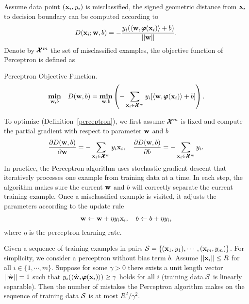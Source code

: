 {Assume data point $(\mathbf {x}_i,y_i)$ is misclassified, the signed geometric distance from $\mathbf {x}_i$ to decision boundary can be computed according to
\begin{align*}
	D(\mathbf {x}_i;\mathbf {w},b) = -\frac{y_i(\langle \mathbf {w}, \pmb \varphi(\mathbf {x}_i) \rangle+b)}{\left|\left| \mathbf {w} \right|\right|}.
\end{align*}
Denote by $\pmb {\mathcal{X}}^m$ the set of misclassified examples, the objective function of Perceptron is defined as
\begin{definition}{Perceptron Objective Function.}\label{perceptron}
	\begin{align*}
		\underset{\mathbf {w},b}{\textbf{min}} \quad D(\mathbf {w},b) = \underset{\mathbf {w},b}{\textbf{min}} \left( -\sum_{\mathbf {x}_i\in\pmb {\mathcal{X}}^{m}}y_i[\langle \mathbf {w}, \pmb \varphi(\mathbf {x}_i) \rangle+b]\right).
	\end{align*}
\end{definition}
To optimize (Definition~\ref{perceptron}), we first assume $\pmb {\mathcal{X}}^{m}$ is fixed and compute the partial gradient with respect to parameter $\mathbf {w}$ and $b$
\begin{align*}
	\frac{\partial D(\mathbf {w},b)}{\partial\mathbf {w}} = -\sum_{\mathbf {x}_i\in\pmb {\mathcal{X}}^m}{y_i\mathbf {x}_i},\quad
	\frac{\partial D(\mathbf {w},b)}{\partial b} = -\sum_{\mathbf {x}_i\in\pmb {\mathcal{X}}^m}{y_i}.
\end{align*}
In practice, the Perceptron algorithm uses stochastic gradient descent that iteratively processes one example from training data at a time.
In each step, the algorithm makes sure the current $\mathbf {w}$ and $b$ will correctly separate the current training example. 
Once a misclassified example is visited, it adjusts the parameters according to the update rule
\begin{align*}
	\mathbf {w} \leftarrow \mathbf {w} + \eta y_i \mathbf {x}_i, \quad b \leftarrow b + \eta y_i,
\end{align*}
where $\eta$ is the perceptron learning rate.
\begin{theory}\label{perceptron_theory}
	Given a sequence of training examples in pairs $\mathcal{S}=\{(\mathbf {x}_1,y_1),\cdots,(\mathbf {x}_m,y_m)\}$. 
	For simplicity, we consider a perceptron without bias term $b$.
	Assume $\left|\left| \mathbf {x}_i \right|\right|\le R$ for all $i\in\{1,\cdots,m\}$.
	Suppose for some $\gamma>0$ there exists a unit length vector $\left|\left| \hat{\mathbf {w}} \right|\right|=1$ such that $y_i(\langle \hat{\mathbf {w}}, \pmb \varphi(\mathbf {x}_i) \rangle)\ge\gamma$ holds for all $i$ (training data $\mathcal{S}$ is linearly separable).
	Then the number of mistakes the Perceptron algorithm makes on the sequence of training data $\mathcal{S}$ is at most ${R^2}/{\gamma^2}$.
\end{theory}
}
